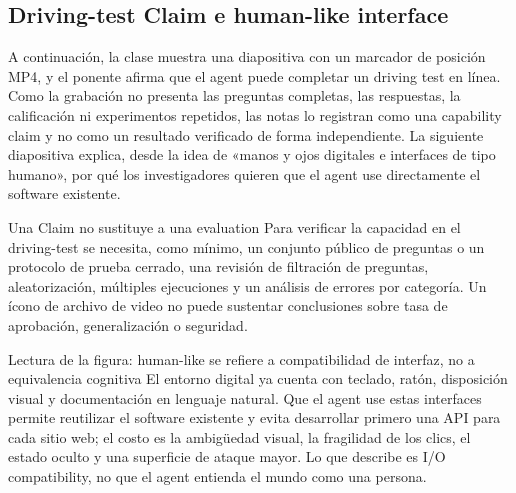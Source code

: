 
\subsection{Driving-test Claim e human-like interface}

A continuación, la clase muestra una diapositiva con un marcador de posición MP4, y el ponente afirma que el agent puede completar un driving test en línea. Como la grabación no presenta las preguntas completas, las respuestas, la calificación ni experimentos repetidos, las notas lo registran como una capability claim y no como un resultado verificado de forma independiente. La siguiente diapositiva explica, desde la idea de «manos y ojos digitales e interfaces de tipo humano», por qué los investigadores quieren que el agent use directamente el software existente.


\begin{warningbox}{Una Claim no sustituye a una evaluation}
Para verificar la capacidad en el driving-test se necesita, como mínimo, un conjunto público de preguntas o un protocolo de prueba cerrado, una revisión de filtración de preguntas, aleatorización, múltiples ejecuciones y un análisis de errores por categoría. Un ícono de archivo de video no puede sustentar conclusiones sobre tasa de aprobación, generalización o seguridad.
\end{warningbox}


\begin{knowledgebox}{Lectura de la figura: human-like se refiere a compatibilidad de interfaz, no a equivalencia cognitiva}
El entorno digital ya cuenta con teclado, ratón, disposición visual y documentación en lenguaje natural. Que el agent use estas interfaces permite reutilizar el software existente y evita desarrollar primero una API para cada sitio web; el costo es la ambigüedad visual, la fragilidad de los clics, el estado oculto y una superficie de ataque mayor. Lo que describe es I/O compatibility, no que el agent entienda el mundo como una persona.
\end{knowledgebox}

